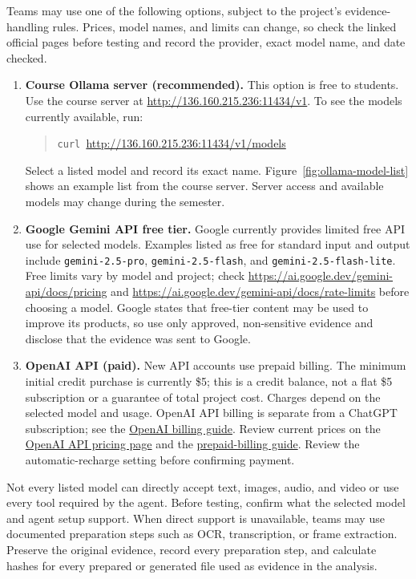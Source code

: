 \documentclass[12pt,letterpaper]{article}
\begin{document}
Teams may use one of the following options, subject to the project's evidence-handling rules. Prices, model names, and limits can change, so check the linked official pages before testing and record the provider, exact model name, and date checked.
\begin{enumerate}
    \item \textbf{Course Ollama server (recommended).} This option is free to students. Use the course server at \url{http://136.160.215.236:11434/v1}. To see the models currently available, run:
          \begin{quote}
              \texttt{curl }\url{http://136.160.215.236:11434/v1/models}
          \end{quote}
          Select a listed model and record its exact name. Figure~\ref{fig:ollama-model-list} shows an example list from the course server. Server access and available models may change during the semester.

    \item \textbf{Google Gemini API free tier.} Google currently provides limited free API use for selected models. Examples listed as free for standard input and output include \texttt{gemini-2.5-pro}, \texttt{gemini-2.5-flash}, and \texttt{gemini-2.5-flash-lite}. Free limits vary by model and project; check \url{https://ai.google.dev/gemini-api/docs/pricing} and \url{https://ai.google.dev/gemini-api/docs/rate-limits} before choosing a model. Google states that free-tier content may be used to improve its products, so use only approved, non-sensitive evidence and disclose that the evidence was sent to Google.

    \item \textbf{OpenAI API (paid).} New API accounts use prepaid billing. The minimum initial credit purchase is currently \$5; this is a credit balance, not a flat \$5 subscription or a guarantee of total project cost. Charges depend on the selected model and usage. OpenAI API billing is separate from a ChatGPT subscription; see the \href{https://help.openai.com/en/articles/9039756-managing-billing-for-chatgpt-and-the-api-platform}{OpenAI billing guide}. Review current prices on the \href{https://platform.openai.com/pricing}{OpenAI API pricing page} and the \href{https://help.openai.com/en/articles/8264644-setting-up-and-managing-prepaid-api-billing}{prepaid-billing guide}. Review the automatic-recharge setting before confirming payment.
\end{enumerate}

Not every listed model can directly accept text, images, audio, and video or use every tool required by the agent. Before testing, confirm what the selected model and agent setup support. When direct support is unavailable, teams may use documented preparation steps such as OCR, transcription, or frame extraction. Preserve the original evidence, record every preparation step, and calculate hashes for every prepared or generated file used as evidence in the analysis.
\end{document}
